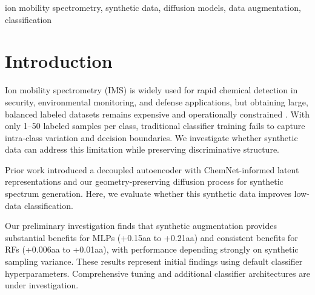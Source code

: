 \documentclass[conference]{IEEEtran}
\begin{document}
\begin{IEEEkeywords}
ion mobility spectrometry, synthetic data, diffusion models, data augmentation, classification
\end{IEEEkeywords}

\section{Introduction}
Ion mobility spectrometry (IMS) is widely used for rapid chemical detection in security, environmental monitoring, and defense applications, but obtaining large, balanced labeled datasets remains expensive and operationally constrained \cite{hill1990ion, dodds2019ion}. With only 1--50 labeled samples per class, traditional classifier training fails to capture intra-class variation and decision boundaries. We investigate whether synthetic data can address this limitation while preserving discriminative structure.

Prior work \cite{metzler2026, dunham2024oracle, preuer2019frechet, ho2020denoising} introduced a decoupled autoencoder with ChemNet-informed latent representations and our geometry-preserving diffusion process for synthetic spectrum generation. Here, we evaluate whether this synthetic data improves low-data classification.

Our preliminary investigation finds that synthetic augmentation provides substantial benefits for MLPs (+0.15aa to +0.21aa) and consistent benefits for RFs (+0.006aa to +0.01aa), with performance depending strongly on synthetic sampling variance. These results represent initial findings using default classifier hyperparameters. Comprehensive tuning and additional classifier architectures are under investigation.
\end{document}
